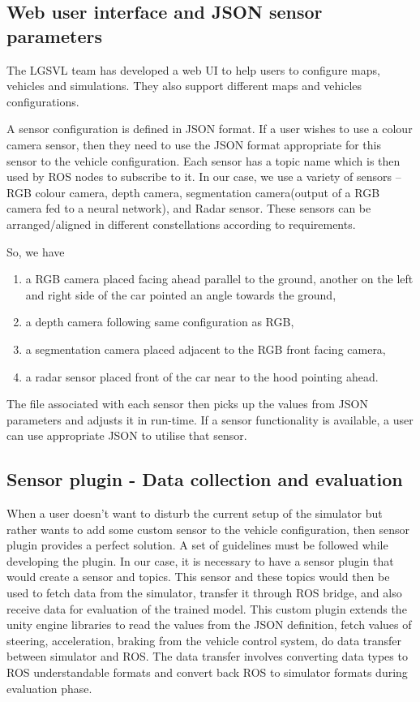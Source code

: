 \subsection{Web user interface and JSON sensor parameters}
The LGSVL team has developed a web UI to help users to configure maps, vehicles and
simulations. They also support different maps and vehicles configurations.

A sensor configuration is defined in JSON format. If a user wishes to use a colour camera
sensor, then they need to use the JSON format appropriate for this sensor to the vehicle
configuration. Each sensor has a topic name which is then used by ROS nodes to subscribe
to it. In our case, we use a variety of sensors -- RGB colour camera, depth camera,
segmentation camera(output of a RGB camera fed to a neural network), and Radar sensor.
These sensors can be arranged/aligned in different constellations according to
requirements.

So, we have

\begin{enumerate}

    \item a RGB camera placed facing ahead parallel to the ground, another on
the left and right side of the car pointed an angle towards the ground,
    \item a depth camera following same configuration as RGB,
    \item a segmentation camera placed adjacent to the RGB front facing camera,
    \item a radar sensor placed front of the car near to the hood pointing ahead.
\end{enumerate}

The file associated with each sensor then picks up the values from JSON parameters and adjusts it in
run-time. If a sensor functionality is available, a user can use appropriate JSON to
utilise that sensor.

\subsection{Sensor plugin - Data collection and evaluation}
When a user doesn't want to disturb the current setup of the simulator but rather wants to add
some custom sensor to the vehicle configuration, then sensor plugin provides a perfect
solution. A set of guidelines must be followed while developing the plugin. In our case,
it is necessary to have a sensor plugin that would create a sensor and topics. This sensor
and these topics would then be used to fetch data from the simulator, transfer it through ROS bridge, and also receive
data for evaluation of the trained model. This custom plugin
extends the unity engine libraries to read the values from the JSON definition, fetch
values of steering, acceleration, braking from the vehicle control system, do
data transfer between simulator and ROS. The data transfer involves converting data types
to ROS understandable formats and convert back ROS to simulator formats during evaluation
phase.

